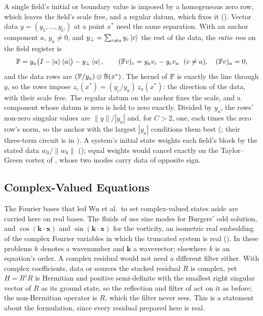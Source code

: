 A single field's initial or boundary value is imposed by a homogeneous zero row, which leaves the field's scale free, and a regular datum, which fixes it (). Vector data $y=(y_1,\dots,y_C)$ at a point $x^*$ need the same separation. With an anchor component $a$, $y_a\ne0$, and $y_\perp=\sum_{c\ne a}y_c\ket{c}$ the rest of the data, the \emph{ratio row} on the field register is
\begin{equation}
    \mathbb{F} = y_a\bigl(I-\ket{a}\bra{a}\bigr)-y_\perp\bra{a},
    \qquad
    (\mathbb{F} v)_c = y_a v_c - y_c v_a\ \ (c\ne a),\quad (\mathbb{F} v)_a=0,
    \label{eq:ratio-row}
\end{equation}
and the data rows are $(\mathbb{F}/y_a)\otimes\mathbb{B}(x^*)$. The kernel of $\mathbb{F}$ is exactly the line through $y$, so the rows impose $z_c(x^*)=(y_c/y_a)\,z_a(x^*)$: the direction of the data, with their scale free. The regular datum on the anchor fixes the scale, and a component whose datum is zero is held to zero exactly. Divided by $y_a$, the rows' non-zero singular values are $\|y\|/|y_a|$ and, for $C>2$, one, each times the zero row's norm, so the anchor with the largest $|y_a|$ conditions them best (; their three-term circuit is in ). A system's initial state weights each field's block by the stated data $w_0/\|w_0\|$ (); equal weights would cancel exactly on the Taylor--Green vortex of , whose two modes carry data of opposite sign.

\subsection{Complex-Valued Equations}
\label{sec:systems-complex}

The Fourier bases that led Wu et al.\ to set complex-valued states aside are carried here on real bases. The fluids of  use sine modes for Burgers' odd solution, and $\cos(\mathbf k\cdot\mathbf x)$ and $\sin(\mathbf k\cdot\mathbf x)$ for the vorticity, an isometric real embedding of the complex Fourier variables in which the truncated system is real (). In these problems $k$ denotes a wavenumber and $\mathbf k$ a wavevector; elsewhere $k$ is an equation's order. A complex residual would not need a different filter either. With complex coefficients, data or sources the stacked residual $R$ is complex, yet $H=R^\dagger R$ is Hermitian and positive semi-definite with the smallest right singular vector of $R$ as its ground state, so the reflection and filter of  act on it as before; the non-Hermitian operator is $R$, which the filter never sees. This is a statement about the formulation, since every residual prepared here is real.

